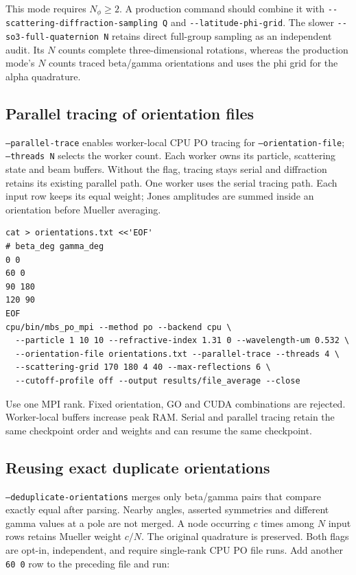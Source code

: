 \documentclass[
  10pt,
  a4paper,
]{article}
\begin{document}
This mode requires $N_\phi\geq2$.  A production command should combine it with
\texttt{-\/-scattering-diffraction-sampling Q} and
\texttt{-\/-latitude-phi-grid}.  The slower
\texttt{-\/-so3-full-quaternion N} retains direct full-group sampling as an
independent audit.  Its $N$ counts complete three-dimensional rotations,
whereas the production mode's $N$ counts traced beta/gamma orientations and
uses the phi grid for the alpha quadrature.

\subsection{Parallel tracing of orientation files}
\texttt{--parallel-trace} enables worker-local CPU PO tracing for
\texttt{--orientation-file}; \texttt{--threads N} selects the worker count.
Each worker owns its particle, scattering state and beam buffers. Without the
flag, tracing stays serial and diffraction retains its existing parallel path.
One worker uses the serial tracing path. Each input row keeps its equal weight;
Jones amplitudes are summed inside an orientation before Mueller averaging.

\begin{verbatim}
cat > orientations.txt <<'EOF'
# beta_deg gamma_deg
0 0
60 0
90 180
120 90
EOF
cpu/bin/mbs_po_mpi --method po --backend cpu \
  --particle 1 10 10 --refractive-index 1.31 0 --wavelength-um 0.532 \
  --orientation-file orientations.txt --parallel-trace --threads 4 \
  --scattering-grid 170 180 4 40 --max-reflections 6 \
  --cutoff-profile off --output results/file_average --close
\end{verbatim}

Use one MPI rank. Fixed orientation, GO and CUDA combinations are rejected.
Worker-local buffers increase peak RAM. Serial and parallel tracing retain the
same checkpoint order and weights and can resume the same checkpoint.

\subsection{Reusing exact duplicate orientations}
\texttt{--deduplicate-orientations} merges only beta/gamma pairs that compare
exactly equal after parsing. Nearby angles, asserted symmetries and different
gamma values at a pole are not merged. A node occurring $c$ times among $N$
input rows retains Mueller weight $c/N$. The original quadrature is preserved.
Both flags are opt-in, independent, and require single-rank CPU PO file runs.
Add another \texttt{60 0} row to the preceding file and run:
\end{document}
